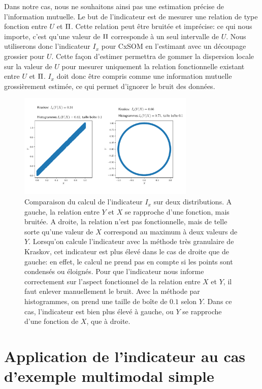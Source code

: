 Dans notre cas, nous ne souhaitons ainsi pas une estimation précise de l'information mutuelle.
Le but de l'indicateur est de mesurer une relation de type fonction entre $U$ et $\Pi$.
Cette relation peut être bruitée et imprécise: ce qui nous importe, c'est qu'une valeur de $\Pi$ corresponde à un seul intervalle de $U$.
Nous utiliserons donc l'indicateur $I_x$ pour CxSOM en l'estimant avec un découpage grossier pour $U$. Cette façon d'estimer permettra de gommer la dispersion locale sur la valeur de $U$ pour mesurer uniquement la relation fonctionnelle existant entre $U$ et $\Pi$.
$I_x$ doit donc être compris comme une information mutuelle grossièrement estimée, ce qui permet d'ignorer le bruit des données.

\begin{figure}
    \centering
    \includegraphics[width=0.75\textwidth]{comparaison_binning_kraskov.pdf}
    \caption{Comparaison du calcul de l'indicateur $I_x$ sur deux distributions. A gauche, la relation entre $Y$ et $X$ se rapproche d'une fonction, mais bruitée. A droite, la relation n'est pas fonctionnelle, mais de telle sorte qu'une valeur de $X$ correspond au maximum à deux valeurs de $Y$. Lorsqu'on calcule l'indicateur avec la méthode très granulaire de Kraskov, cet indicateur est plus élevé dans le cas de droite que de gauche: en effet, le calcul ne prend pas en compte si les points sont condensés ou éloignés. Pour que l'indicateur nous informe correctement sur l'aspect fonctionnel de la relation entre $X$ et $Y$, il faut enlever manuellement le bruit. Avec la méthode par histogrammes, on prend une taille de boîte de $0.1$ selon $Y$. Dans ce cas, l'indicateur est bien plus élevé à gauche, ou $Y$ se rapproche d'une fonction de $X$, que à droite.}
    \label{fig:exemple-limite}
    \end{figure}


\section{Application de l'indicateur au cas d'exemple multimodal simple}

